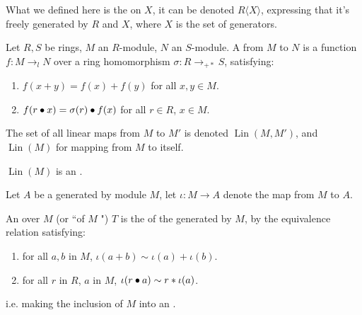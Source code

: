 \begin{remark}
    \label{mk:FreeAlgebra}

    What we defined here is the  on $X$, it can be denoted $R\langle X \rangle$,
    expressing that it's freely generated by $R$ and $X$, where $X$ is the set of generators.

\end{remark}

\begin{definition}
    \label{LinearMap}
    \leanok

    Let $R, S$ be rings, $M$ an $R$-module, $N$ an $S$-module.
    A  from $M$ to $N$ is a function $f : M \to_{l} N$ over a ring homomorphism $\sigma : R \to_{+*} S$, satisfying:

    \begin{enumerate}

    \item $f(x + y) = f(x) + f(y)$ for all $x, y \in M$.
    \item $f(r \bullet x) = \sigma(r) \bullet f(x)$ for all $r \in R$, $x \in M$.
    
    \end{enumerate}

\end{definition}

\begin{remark}
    \label{mk:linearMap}

    The set of all linear maps from $M$ to $M'$ is denoted $\operatorname{Lin}(M, M')$,
    and $\operatorname{Lin}(M)$ for mapping from $M$ to itself.
    
    $\operatorname{Lin}(M)$ is an .

\end{remark}

\begin{definition}
    \label{TensorAlgebra}
    \leanok

    Let $A$ be a  generated by module $M$, let $\iota : M \to A$ denote the map from $M$ to $A$.

    An  over $M$ (or ``of $M$ ") $T$ is the  of the  generated by $M$, 
    by the equivalence relation satisfying:

    \begin{enumerate}

    \item for all $a, b$ in $M$, $\iota(a + b) \sim \iota(a) + \iota(b)$.
    \item for all $r$ in $R$, $a$ in $M$, $\iota(r \bullet a) \sim r * \iota(a)$.
    
    \end{enumerate}

    i.e. making the inclusion of $M$ into an .

\end{definition}

